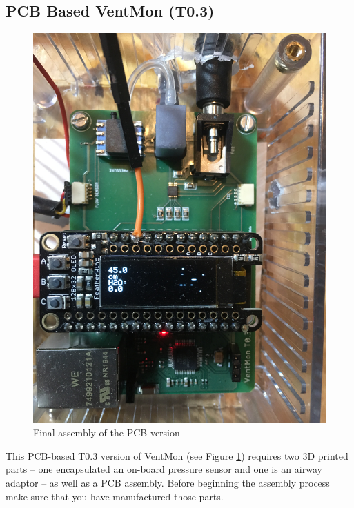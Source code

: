 \documentclass[11pt, letterpaper]{article}
\begin{document}

\subsection{PCB Based VentMon (T0.3)}


\begin{figure}[H]
\centering
\includegraphics[width=\textwidth]{images/PCBVentMon.JPG}
\caption{Final assembly of the PCB version}
\label{fig:finalPCB}
\end{figure}

This PCB-based T0.3 version of VentMon (see Figure \ref{fig:finalPCB}) requires two 3D printed parts  -- one encapsulated an on-board pressure sensor and one is an airway adaptor -- as well as a PCB assembly. Before beginning the assembly process make sure that you have manufactured those parts.
\end{document}
